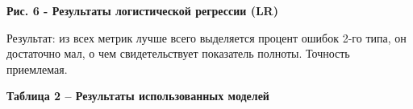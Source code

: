 {\bfseries Рис. 6 - Результаты логистической регрессии (LR)}

Результат: из всех метрик лучше всего выделяется процент ошибок 2-го
типа, он достаточно мал, о чем свидетельствует показатель полноты.
Точность приемлемая.

{\bfseries Таблица 2 -- Результаты использованных моделей}


